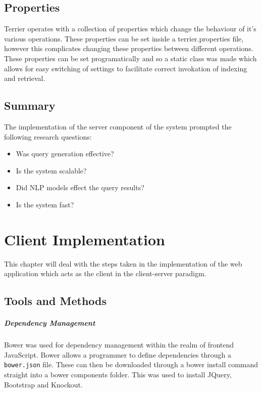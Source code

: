 \documentclass{l4proj}
\newcommand{\code}[1]{\texttt{#1}}
\begin{document}
\section{Properties}
Terrier operates with a collection of properties which change the behaviour of it's various operations. These properties can be set inside a terrier.properties file, however this complicates changing these properties between different operations. These properties can be set programatically and so a static class was made which allows for easy switching of settings to facilitate correct invokation of indexing and retrieval.

\section{Summary} \label{serversummary}
The implementation of the server component of the system prompted the following research questions:
\begin{itemize}
\item Was query generation effective?
\item Is the system scalable?
\item Did NLP models effect the query results?
\item Is the system fast?
\end{itemize}

\chapter{Client Implementation} \label{clientimplementation}
This chapter will deal with the steps taken in the implementation of the web application which acts as the client in the client-server paradigm.

\section{Tools and Methods}
\paragraph{Dependency Management}
Bower was used for dependency management within the realm of frontend JavaScript. Bower allows a programmer to define dependencies through a \code{bower.json} file. These can then be downloaded through a bower install command straight into a bower components folder. This was used to install JQuery, Bootstrap and Knockout.
\end{document}
